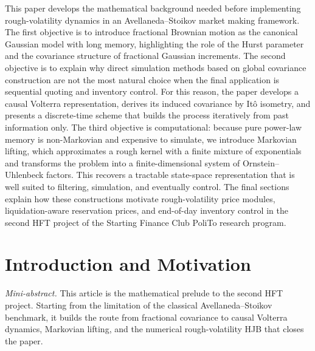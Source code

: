 \documentclass[a4paper,10pt,titlepage,oneside,openany]{book}
\theoremstyle{plain}
\theoremstyle{definition}
\theoremstyle{remark}
\newenvironment{tightabstract}[1][0.88]{%
  \begin{center}
  \begin{tcolorbox}[title={Abstract}, width=#1\textwidth, left=5mm, right=5mm,
    colback=white, boxrule=0.4pt]
  \small\justifying
}{%
  \end{tcolorbox}
  \end{center}
}
\newcommand{\miniabstract}[1]{%
\vspace{-2pt}
\begin{tcolorbox}[colback=gray!6,colframe=black!15,boxrule=0.3pt,arc=3pt,left=6pt,right=6pt,top=4pt,bottom=4pt]
\textit{Mini-abstract.} #1
\end{tcolorbox}
\vspace{-4pt}
}
\newcommand{\1}{\mathbf{1}}
\begin{document}
\begin{titlepage}
\begin{center}
\vspace{1cm}
\begin{tightabstract}
This paper develops the mathematical background needed before implementing rough-volatility dynamics in an Avellaneda--Stoikov market making framework. The first objective is to introduce fractional Brownian motion as the canonical Gaussian model with long memory, highlighting the role of the Hurst parameter and the covariance structure of fractional Gaussian increments. The second objective is to explain why direct simulation methods based on global covariance construction are not the most natural choice when the final application is sequential quoting and inventory control. For this reason, the paper develops a causal Volterra representation, derives its induced covariance by It\^o isometry, and presents a discrete-time scheme that builds the process iteratively from past information only. The third objective is computational: because pure power-law memory is non-Markovian and expensive to simulate, we introduce Markovian lifting, which approximates a rough kernel with a finite mixture of exponentials and transforms the problem into a finite-dimensional system of Ornstein--Uhlenbeck factors. This recovers a tractable state-space representation that is well suited to filtering, simulation, and eventually control. The final sections explain how these constructions motivate rough-volatility price modules, liquidation-aware reservation prices, and end-of-day inventory control in the second HFT project of the Starting Finance Club PoliTo research program.
\end{tightabstract}
\end{center}
\end{titlepage}

\frontmatter
\clearpage
{}
\setcounter{page}{1}
\begingroup\small\setlength{\parskip}{0pt}\tableofcontents\endgroup
\thispagestyle{plain}

\chapter*{Introduction and Motivation}
\miniabstract{This article is the mathematical prelude to the second HFT project. Starting from the limitation of the classical Avellaneda--Stoikov benchmark, it builds the route from fractional covariance to causal Volterra dynamics, Markovian lifting, and the numerical rough-volatility HJB that closes the paper.}
\end{document}
